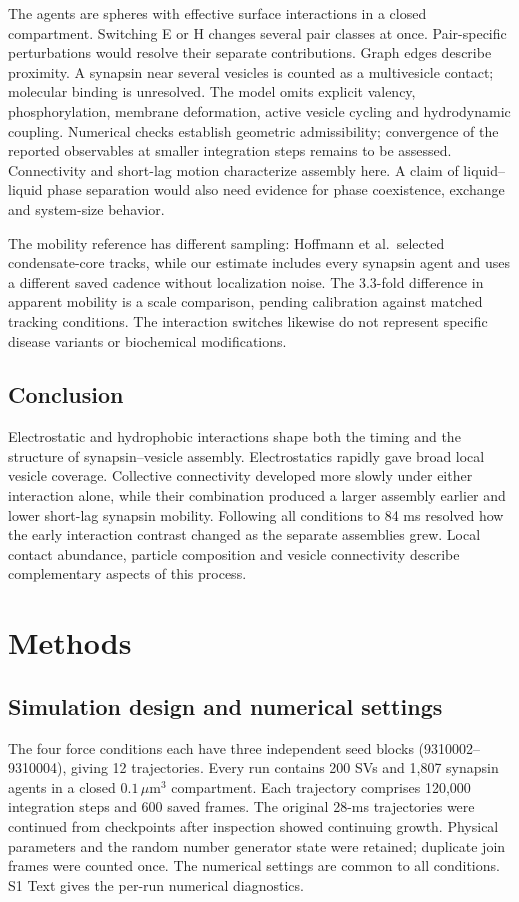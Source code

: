\documentclass[11pt,letterpaper]{article}
\begin{document}
The agents are spheres with effective surface interactions in a closed
compartment. Switching E or H changes several pair classes at once.
Pair-specific perturbations would resolve their separate contributions.
Graph edges describe proximity. A synapsin near several vesicles is
counted as a multivesicle contact; molecular binding is unresolved.
The model omits explicit valency, phosphorylation, membrane deformation,
active vesicle cycling and hydrodynamic coupling. Numerical checks
establish geometric admissibility; convergence of the reported observables
at smaller integration steps remains to be assessed. Connectivity and
short-lag motion characterize assembly here. A claim of liquid--liquid
phase separation would also need evidence for phase coexistence,
exchange and system-size behavior.

The mobility reference has different sampling: Hoffmann et al.\ selected
condensate-core tracks, while our estimate includes every synapsin agent
and uses a different saved cadence without localization noise. The
3.3-fold difference in apparent mobility is a scale comparison, pending
calibration against matched tracking conditions. The interaction
switches likewise do not represent specific disease variants or
biochemical modifications.

\subsection*{Conclusion}
Electrostatic and hydrophobic interactions shape both the timing and
the structure of synapsin--vesicle assembly. Electrostatics rapidly
gave broad local vesicle coverage. Collective connectivity developed
more slowly under either interaction alone, while their combination
produced a larger assembly earlier and lower short-lag synapsin
mobility. Following all conditions to 84 ms resolved how the early
interaction contrast changed as the separate assemblies grew.
Local contact abundance, particle composition and vesicle
connectivity describe complementary aspects of this process.

\section{Methods}
\subsection{Simulation design and numerical settings}
The four force conditions each have three independent seed blocks
(9310002--9310004), giving 12 trajectories. Every run contains 200 SVs
and 1,807 synapsin agents in a closed $0.1\,\mu$m$^3$ compartment. Each
trajectory comprises 120,000 integration steps and 600 saved frames.
The original 28-ms trajectories were continued from checkpoints after
inspection showed continuing growth. Physical parameters and the random
number generator state were retained; duplicate join frames were counted once.
The numerical settings are common to all conditions. S1 Text gives the
per-run numerical diagnostics.
\end{document}
